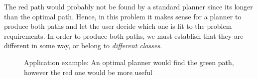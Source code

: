 \documentclass[graybox]{svmult}
\begin{document}
The red path would probably not be found by a standard planner since its longer than the optimal path. Hence, in this problem it makes sense for a planner to produce both paths and let the user decide which one is fit to the problem requirements. In order to produce both paths, we must establish that they are different in some way, or belong to \emph{different classes}.

\begin{figure}[]
		\centering
          \caption{Application example: An optimal planner would find the green path, however the red one would be more useful}
          \label{fig:IntroductionHeuristic}
\end{figure}
\end{document}
